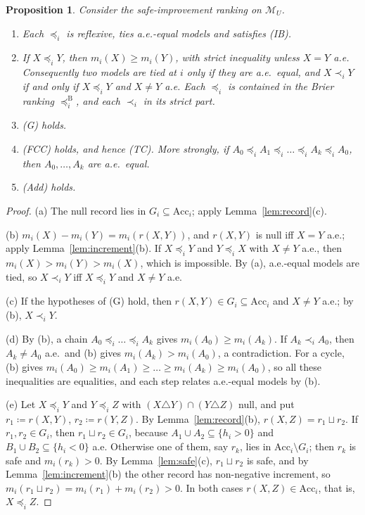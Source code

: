 \documentclass[11pt]{article}
\newcommand{\M}{\mathcal{M}}
\newcommand{\Acc}{\mathrm{Acc}}
\theoremstyle{plain}
\newtheorem{proposition}[theorem]{Proposition}
\theoremstyle{definition}
\theoremstyle{remark}
\begin{document}
\begin{proposition}\label{prop:structure}
Consider the safe-improvement ranking on $\M_U$.
\begin{enumerate}[label=(\alph*)]
  \item Each $\preceq_i$ is reflexive, ties a.e.-equal models and satisfies (IB).
  \item If $X\preceq_iY$, then $m_i(X)\ge m_i(Y)$, with strict inequality unless $X=Y$
  a.e. Consequently two models are tied at $i$ only if they are a.e.\ equal, and
  $X\prec_iY$ if and only if $X\preceq_iY$ and $X\ne Y$ a.e. Each $\preceq_i$ is contained
  in the Brier ranking $\preceq^{\mathrm B}_i$, and each $\prec_i$ in its strict part.
  \item (G) holds.
  \item (FCC) holds, and hence (TC). More strongly, if $A_0\preceq_iA_1\preceq_i\dots
  \preceq_iA_k\preceq_iA_0$, then $A_0,\dots,A_k$ are a.e.\ equal.
  \item (Add) holds.
\end{enumerate}
\end{proposition}

\begin{proof}
(a) The null record lies in $G_i\subseteq\Acc_i$; apply Lemma~\ref{lem:record}(c).

(b) $m_i(X)-m_i(Y)=m_i(r(X,Y))$, and $r(X,Y)$ is null iff $X=Y$ a.e.; apply
Lemma~\ref{lem:increment}(b). If $X\preceq_iY$ and $Y\preceq_iX$ with $X\ne Y$ a.e., then
$m_i(X)>m_i(Y)>m_i(X)$, which is impossible. By (a), a.e.-equal models are tied, so
$X\prec_iY$ iff $X\preceq_iY$ and $X\ne Y$ a.e.

(c) If the hypotheses of (G) hold, then $r(X,Y)\in G_i\subseteq\Acc_i$ and $X\ne Y$
a.e.; by (b), $X\prec_iY$.

(d) By (b), a chain $A_0\preceq_i\dots\preceq_iA_k$ gives $m_i(A_0)\ge m_i(A_k)$. If
$A_k\prec_iA_0$, then $A_k\ne A_0$ a.e.\ and (b) gives $m_i(A_k)>m_i(A_0)$, a
contradiction. For a cycle, (b) gives $m_i(A_0)\ge m_i(A_1)\ge\dots\ge m_i(A_k)\ge
m_i(A_0)$, so all these inequalities are equalities, and each step relates a.e.-equal
models by (b).

(e) Let $X\preceq_iY$ and $Y\preceq_iZ$ with $(X\triangle Y)\cap(Y\triangle Z)$ null, and
put $r_1\coloneqq r(X,Y)$, $r_2\coloneqq r(Y,Z)$. By Lemma~\ref{lem:record}(b),
$r(X,Z)=r_1\sqcup r_2$. If $r_1,r_2\in G_i$, then $r_1\sqcup r_2\in G_i$, because
$A_1\cup A_2\subseteq\{h_i>0\}$ and $B_1\cup B_2\subseteq\{h_i<0\}$ a.e. Otherwise one of
them, say $r_k$, lies in $\Acc_i\setminus G_i$; then $r_k$ is safe and $m_i(r_k)>0$. By
Lemma~\ref{lem:safe}(c), $r_1\sqcup r_2$ is safe, and by Lemma~\ref{lem:increment}(b)
the other record has non-negative increment, so $m_i(r_1\sqcup r_2)=m_i(r_1)+m_i(r_2)>0$.
In both cases $r(X,Z)\in\Acc_i$, that is, $X\preceq_iZ$.
\end{proof}
\end{document}
